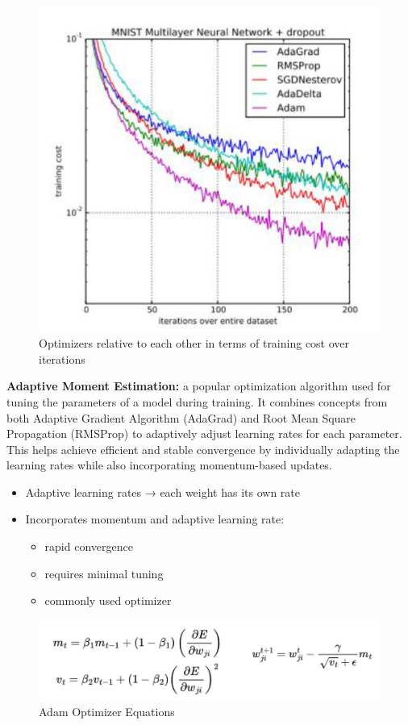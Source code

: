 \begin{figure}[h!t]
    \centering
    \includegraphics[width=0.4\linewidth]{optimizers.png}
    \caption{Optimizers relative to each other in terms of training cost over iterations}
    \label{fig:enter-label}
\end{figure}

\begin{definition}
    \textbf{Adaptive Moment Estimation:} a popular optimization algorithm used for tuning the parameters of a model during training. It combines concepts from both Adaptive Gradient Algorithm (AdaGrad) and Root Mean Square Propagation (RMSProp) to adaptively adjust learning rates for each parameter. This helps achieve efficient and stable convergence by individually adapting the learning rates while also incorporating momentum-based updates.
\end{definition}

\begin{itemize}
    \item Adaptive learning rates → each weight has its own rate
    \item Incorporates momentum and adaptive learning rate:
    \begin{itemize}
        \item rapid convergence
        \item requires minimal tuning
        \item commonly used optimizer
    \end{itemize}
\end{itemize}

\begin{figure}[h!t]
    \centering
    \includegraphics[width=0.4\linewidth]{adam.png}
    \caption{Adam Optimizer Equations}
    \label{fig:enter-label}
\end{figure}

